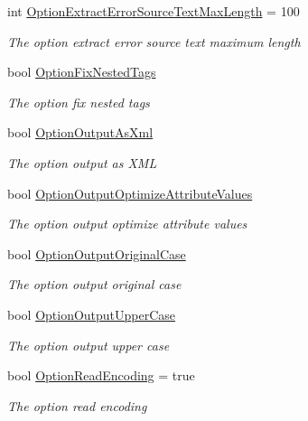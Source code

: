 \begin{DoxyCompactItemize}
int \hyperlink{class_html_agility_pack_1_1_html_document_aeccf612f99e961e07408cba393374fe2}{Option\+Extract\+Error\+Source\+Text\+Max\+Length} = 100
\begin{DoxyCompactList}\small\item\em The option extract error source text maximum length \end{DoxyCompactList}\item 
bool \hyperlink{class_html_agility_pack_1_1_html_document_aabe37347a017a334d81ee4ef9f2c671e}{Option\+Fix\+Nested\+Tags}
\begin{DoxyCompactList}\small\item\em The option fix nested tags \end{DoxyCompactList}\item 
bool \hyperlink{class_html_agility_pack_1_1_html_document_abb5c14b55e24fc56f892450328df2445}{Option\+Output\+As\+Xml}
\begin{DoxyCompactList}\small\item\em The option output as X\+ML \end{DoxyCompactList}\item 
bool \hyperlink{class_html_agility_pack_1_1_html_document_a79fc2d0e09cb57d3158d4dbe3a26e4f4}{Option\+Output\+Optimize\+Attribute\+Values}
\begin{DoxyCompactList}\small\item\em The option output optimize attribute values \end{DoxyCompactList}\item 
bool \hyperlink{class_html_agility_pack_1_1_html_document_a2ae8bba76c1a8d28287b875fbe7c5524}{Option\+Output\+Original\+Case}
\begin{DoxyCompactList}\small\item\em The option output original case \end{DoxyCompactList}\item 
bool \hyperlink{class_html_agility_pack_1_1_html_document_ad0f759150aaeea85c51b7b44bf462535}{Option\+Output\+Upper\+Case}
\begin{DoxyCompactList}\small\item\em The option output upper case \end{DoxyCompactList}\item 
bool \hyperlink{class_html_agility_pack_1_1_html_document_a37d983eef6e6bad2364207b4fbc16f28}{Option\+Read\+Encoding} = true
\begin{DoxyCompactList}\small\item\em The option read encoding \end{DoxyCompactList}\item 

\end{DoxyCompactItemize}
